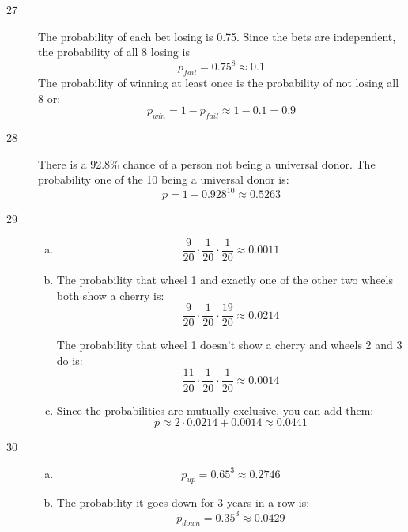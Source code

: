 \documentclass[letterpaper]{exam}
\begin{document}
    \begin{description}

      \item[27] 
        The probability of each bet losing is 0.75. Since the bets are
        independent, the probability of all 8 losing is
        \[
          p_{fail} = 0.75^8 \approx 0.1
        \]
        The probability of winning at least once is the probability of not
        losing all 8 or:
        \[
          p_{win} = 1 - p_{fail} \approx 1 - 0.1 = \boxed{ 0.9 } 
        \]

      \item[28]
        There is a 92.8\% chance of a person not being a universal donor. The
        probability one of the 10 being a universal donor is:
        \[
          p = 1 - 0.928^{10} \approx \boxed{ 0.5263 }
        \]

      \item[29]
        \begin{enumerate}[(a)]
          \item 
            \[
              \frac{9}{20} \cdot \frac{1}{20} \cdot \frac{1}{20} 
                \approx \boxed{ 0.0011 }
            \]

          \item
              The probability that wheel 1 and exactly one of the other two
              wheels both show a cherry is:
              \[
                \frac{9}{20} \cdot \frac{1}{20} \cdot \frac{19}{20} 
                  \approx \boxed{ 0.0214 }
              \]

              The probability that wheel 1 doesn't show a cherry and wheels 2 and 3 
              do is:
              \[
                \frac{11}{20} \cdot \frac{1}{20} \cdot \frac{1}{20} 
                  \approx \boxed{ 0.0014 }
              \]

            \item
              Since the probabilities are mutually exclusive, you can add them:
              \[
                p \approx 2 \cdot 0.0214 + 0.0014 \approx \boxed{ 0.0441 } 
              \]
        \end{enumerate}

      \item[30]
        \begin{enumerate}[(a)]
          \item 
            \[
              p_{up} = 0.65^3 \approx \boxed{ 0.2746 }
            \]

          \item 
            The probability it goes down for 3 years in a row is:
            \[
              p_{down} = 0.35^3 \approx 0.0429
            \]


\end{enumerate}
\end{description}
\end{document}
